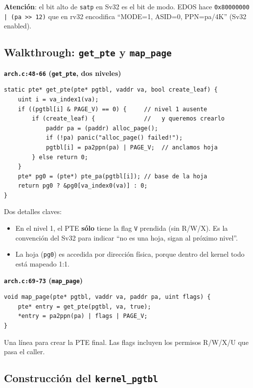 \documentclass[11pt,a4paper]{article}
\begin{document}
\textbf{Atención}: el bit alto de \texttt{satp} en Sv32 es el bit
de modo. EDOS hace \texttt{0x80000000 | (pa >> 12)} que en rv32
encodifica ``MODE=1, ASID=0, PPN=pa/4K'' (Sv32 enabled).

\subsection*{Walkthrough: \texttt{get\_pte} y \texttt{map\_page}}

\begin{walkthrough}
\textbf{\texttt{arch.c:48-66} (\texttt{get\_pte}, dos niveles)}

\begin{lstlisting}[style=cstyle]
static pte* get_pte(pte* pgtbl, vaddr va, bool create_leaf) {
    uint i = va_index1(va);
    if ((pgtbl[i] & PAGE_V) == 0) {     // nivel 1 ausente
        if (create_leaf) {              //   y queremos crearlo
            paddr pa = (paddr) alloc_page();
            if (!pa) panic("alloc_page() failed!");
            pgtbl[i] = pa2ppn(pa) | PAGE_V;  // anclamos hoja
        } else return 0;
    }
    pte* pg0 = (pte*) pte_pa(pgtbl[i]); // base de la hoja
    return pg0 ? &pg0[va_index0(va)] : 0;
}
\end{lstlisting}

Dos detalles claves:

\begin{itemize}[nosep,leftmargin=*]
    \item En el nivel 1, el PTE \textbf{sólo} tiene la flag
        \texttt{V} prendida (sin R/W/X). Es la convención del Sv32
        para indicar ``no es una hoja, sigan al próximo nivel''.
    \item La hoja (\texttt{pg0}) es accedida por dirección física,
        porque dentro del kernel todo está mapeado 1:1.
\end{itemize}

\textbf{\texttt{arch.c:69-73} (\texttt{map\_page})}

\begin{lstlisting}[style=cstyle]
void map_page(pte* pgtbl, vaddr va, paddr pa, uint flags) {
    pte* entry = get_pte(pgtbl, va, true);
    *entry = pa2ppn(pa) | flags | PAGE_V;
}
\end{lstlisting}

Una línea para crear la PTE final. Las flags incluyen los
permisos R/W/X/U que pasa el caller.
\end{walkthrough}

\subsection*{Construcción del \texttt{kernel\_pgtbl}}
\end{document}
